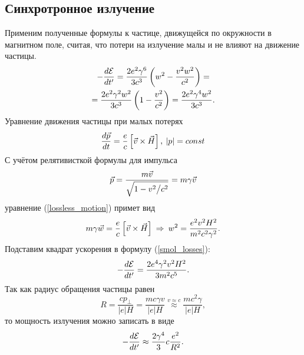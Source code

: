 \newpage
\subsection{Синхротронное излучение}
    \begin{figure}[h]
        \centering{
            
        }
    \end{figure}
    Применим полученные формулы к частице, движущейся по окружности в магнитном поле, считая, что потери на излучение малы и не влияют на движение частицы.
    \begin{gather}
        -\frac{d\mathcal{E}}{dt'} = \frac{2e^2\gamma^6}{3c^3}\left({w^2 - \frac{v^2w^2}{c^2}}\right) = \notag \\ = 
        \frac{2e^2\gamma^2w^2}{3c^3}\left({1 - \frac{v^2}{c^2}}\right) = \frac{2e^2\gamma^4w^2}{3c^3}. \label{smol_losses}
    \end{gather}
    Уравнение движения частицы при малых потерях
    \begin{equation}
        \frac{d\vec{p}}{dt} = \frac ec \left[{\vec{v}\times\vec{H}}\right], \: \left|{p}\right| = const \label{lossless_motion}
    \end{equation}
    С учётом релятивисткой формулы для импульса
    \[
        \vec{p} = \frac{m\vec{v}}{\sqrt{1 - v^2 \big/ c^2}} = m\gamma\vec{v}
    \]
    уравнение (\ref{lossless_motion}) примет вид
    \begin{equation*}
        m\gamma\vec{w} = \frac ec \left[{\vec{v}\times\vec{H}}\right] \: \Rightarrow \: w^2 = \frac{e^2v^2H^2}{m^2c^2\gamma^2}.
    \end{equation*}
    Подставим квадрат ускорения в формулу (\ref{smol_losses}):
    \begin{equation*}
        -\frac{d\mathcal{E}}{dt'} = \frac{2e^4\gamma^2v^2H^2}{3m^2c^5}.
    \end{equation*}
    Так как радиус обращения частицы равен
    \begin{equation*}
        R = \frac{cp_{\perp}}{|e|H} = \frac{mc\gamma v}{|e|H} \overset{v \approx c}{\approx} \frac{mc^2\gamma}{|e|H},
    \end{equation*}
    то мощность излучения можно записать в виде
    \begin{equation*}
        -\frac{d\mathcal{E}}{dt'} \approx \frac{2\gamma^4}{3}c\frac{e^2}{R^2}.
    \end{equation*}

